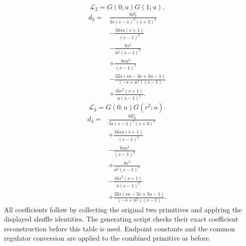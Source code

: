 \begin{equation}
\mathcal L_{2}=G(0;u)G(1;u).
\end{equation}
\begin{align}
d_{2}={}&\frac{8 P_{8}}{3 s \left(s - 1\right)^{2} \left(s + 3\right)^{3}}\\
&- \frac{16 s u \left(s + 1\right)}{\left(s - 1\right)^{2}}\\
&- \frac{8 s^{3}}{u^{2} \left(s - 1\right)^{2}}\\
&+\frac{8 s u^{2}}{\left(s - 1\right)^{2}}\\
&- \frac{32 s \left(s u - 3 s + 3 u - 1\right)}{\left(- s + u^{2}\right) \left(s - 1\right)}\\
&+\frac{16 s^{2} \left(s + 1\right)}{u \left(s - 1\right)^{2}}.
\end{align}
\begin{equation}
\mathcal L_{3}=G(0;u)G(r^{2};u).
\end{equation}
\begin{align}
d_{3}={}&\frac{8 P_{9}}{3 s \left(s - 1\right)^{2} \left(s + 3\right)^{3}}\\
&+\frac{16 s u \left(s + 1\right)}{\left(s - 1\right)^{2}}\\
&- \frac{8 s u^{2}}{\left(s - 1\right)^{2}}\\
&+\frac{8 s^{3}}{u^{2} \left(s - 1\right)^{2}}\\
&- \frac{16 s^{2} \left(s + 1\right)}{u \left(s - 1\right)^{2}}\\
&+\frac{32 s \left(s u - 3 s + 3 u - 1\right)}{\left(- s + u^{2}\right) \left(s - 1\right)}.
\end{align}
All coefficients follow by collecting the original two primitives and applying the displayed shuffle identities. The generating script checks their exact coefficient reconstruction before this table is used. Endpoint constants and the common regulator conversion are applied to the combined primitive as before.


